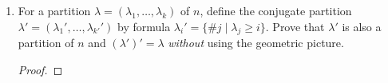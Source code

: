 \documentclass[../psets.tex]{subfiles}
\begin{document}
\begin{enumerate}
\begin{enumerate}
\begin{proof}
\begin{center}
\begin{tabular}{cccccccccc}
                    $3$ & $0$  & $-1$ & $1$  & $-1$ & $-3$ & $-1$ & $0$  & $1$  & $1$\\
                    $3$ & $0$  & $1$  & $-1$ & $-1$ & $-3$ & $1$  & $0$  & $1$  & $-1$\\
                \end{tabular}
            \end{center}
        \end{proof}
    \end{enumerate}
    \item For a partition $\lambda=(\lambda_1,\dots,\lambda_k)$ of $n$, define the conjugate partition $\lambda'=(\lambda_1',\dots,\lambda_{k'}')$ by formula $\lambda_i'=\{\#j\mid\lambda_j\geq i\}$. Prove that $\lambda'$ is also a partition of $n$ and $(\lambda')'=\lambda$ \emph{without} using the geometric picture.
    \begin{proof}







\end{proof}
\end{enumerate}
\end{document}
